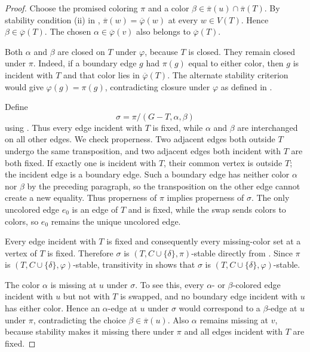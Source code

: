 \begin{proof}
Choose the promised coloring $\pi$ and a color
$\beta\in\overline\pi(u)\cap\overline\pi(T)$.  By stability condition (ii)
in ,
$\overline\pi(w)=\overline\varphi(w)$ at every $w\in V(T)$.  Hence
$\beta\in\overline\varphi(T)$.  The chosen
$\alpha\in\overline\varphi(v)$ also belongs to
$\overline\varphi(T)$.

Both $\alpha$ and $\beta$ are closed on $T$ under $\varphi$, because $T$
is closed.  They remain closed under $\pi$.  Indeed, if a boundary edge
$g$ had $\pi(g)$ equal to either color, then $g$ is incident with $T$ and
that color lies in $\overline\varphi(T)$.  The alternate stability
criterion  would give $\varphi(g)=\pi(g)$, contradicting
closure under $\varphi$ as defined in .

Define
\[
             \sigma=\pi/(G-T,\alpha,\beta)
\]
using .  Thus every edge incident with $T$ is
fixed, while $\alpha$ and $\beta$ are interchanged on all other edges.  We
check properness.  Two adjacent edges both outside $T$ undergo the same
transposition, and two adjacent edges both incident with $T$ are both fixed.
If exactly one is incident with $T$, their common vertex is outside $T$;
the incident edge is a boundary edge.  Such a boundary edge has neither
color $\alpha$ nor $\beta$ by the preceding paragraph, so the transposition
on the other edge cannot create a new equality.  Thus properness of $\pi$
implies properness of $\sigma$.  The only uncolored edge $e_0$ is an edge
of $T$ and is fixed, while the swap sends colors to colors, so $e_0$ remains
the unique uncolored edge.

Every edge incident with $T$ is fixed and consequently every missing-color
set at a vertex of $T$ is fixed.  Therefore $\sigma$ is
$(T,C\cup\{\delta\},\pi)$-stable directly from
.  Since $\pi$ is
$(T,C\cup\{\delta\},\varphi)$-stable, transitivity in  shows
that $\sigma$ is $(T,C\cup\{\delta\},\varphi)$-stable.

The color $\alpha$ is missing at $u$ under $\sigma$.  To see this, every
$\alpha$- or $\beta$-colored edge incident with $u$ but not with $T$ is
swapped, and no boundary edge incident with $u$ has either color.  Hence an
$\alpha$-edge at $u$ under $\sigma$ would correspond to a $\beta$-edge at
$u$ under $\pi$, contradicting the choice
$\beta\in\overline\pi(u)$.  Also $\alpha$ remains missing at $v$, because
stability makes it missing there under $\pi$ and all edges incident with
$T$ are fixed.


\end{proof}
